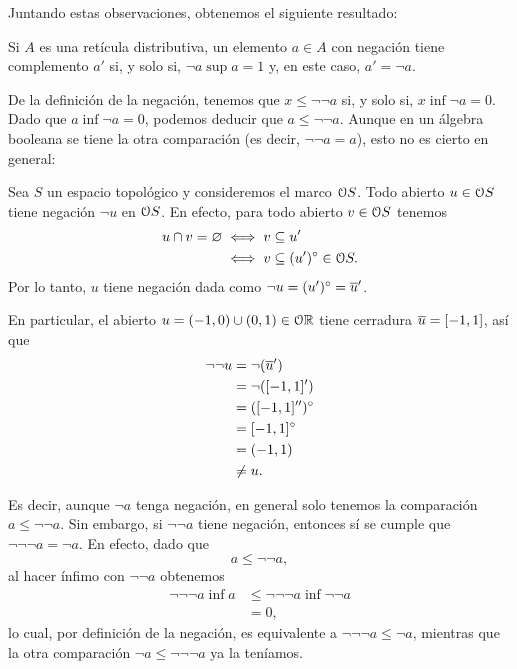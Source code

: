 Juntando estas observaciones, obtenemos el siguiente resultado:
\begin{lemma}
  \label{lemma:complementado-ssi-supneg}
   Si $A$ es una retícula distributiva,
   un elemento $a\in A$ con negación tiene complemento $a'$
   si, y solo si, $\neg a\sup a=1$ y, en este caso, $a'=\neg a$.
\end{lemma}


De la definición de la negación, tenemos que
$x\leq \neg\neg a$ si, y solo si, $x\inf\neg a=0$.
Dado que $a\inf\neg a=0$, podemos deducir que $a\leq\neg\neg a$.
Aunque en un álgebra booleana se tiene la otra comparación
(es decir, $\neg\neg a = a$),
esto no es cierto en general:

\begin{example}
  \label{exa:negaciones-en-espacios-top}
  Sea $S$ un espacio topológico y consideremos el marco $\cal OS$.
  Todo abierto $u\in\cal O S$ tiene negación $\neg u$ en $\cal OS$.
  En efecto, para todo abierto $v\in\cal OS$ tenemos
  \begin{align*}
        u\cap v = \emptyset
        &\iff v\subseteq u' \\
        &\iff v\subseteq (u')^\circ \in\cal OS.
  \end{align*}
  Por lo tanto, $u$ tiene negación dada como
  $\neg u = (u')^\circ = {\ol u}'$.
  
  En particular, el abierto $u=(-1,0)\cup(0,1)\in\cal O\mathbb R$
  tiene cerradura $\ol u = [-1,1]$, así que
  \begin{align*}
    \neg\neg u
    &= \neg(\ol u ') \\
    &= \neg([-1,1]') \\
    &= ([-1,1]'')^\circ \\
    &= [-1,1]^\circ \\
    &= (-1,1) \\
    &\neq u.
  \end{align*}
\end{example}

Es decir, aunque $\neg a$ tenga negación, en general
solo tenemos la comparación $a\leq\neg\neg a$.
Sin embargo, si $\neg\neg a$ tiene negación, entonces sí se
cumple que $\neg\neg\neg a=\neg a$.
En efecto, dado que
\[
  a \leq \neg\neg a
,\]
al hacer ínfimo con $\neg\neg a$ obtenemos
\begin{align*}
  \neg\neg\neg a\inf a
  &\leq \neg\neg\neg a\inf \neg\neg a  \\
  &= 0,
\end{align*}
lo cual, por definición de la negación, es equivalente a
$\neg\neg\neg a\leq\neg a$, mientras que la otra comparación
$\neg a\leq\neg\neg\neg a$ ya la teníamos.

